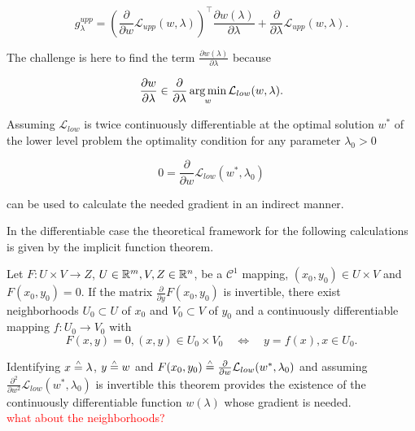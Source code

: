 \begin{equation*}
	g^{upp}_{\lambda} = \left(\frac{\partial}{\partial w}\mathcal{L}_{upp}(w,\lambda) \right)^{\top}\frac{\partial w(\lambda)}{\partial\lambda}+\frac{\partial}{\partial \lambda}\mathcal{L}_{upp}(w,\lambda).
\end{equation*}

The challenge is here to find the term \(\frac{\partial w(\lambda)}{\partial\lambda}\) because 

\[ \frac{\partial w}{\partial \lambda} \in \frac{\partial }{\partial \lambda} \operatorname*{arg\,min}_{w} \mathcal{L}_{low}(w,\lambda). \]

Assuming \(\mathcal{L}_{low}\) is twice continuously differentiable at the  optimal solution \(w^*\) of the lower level problem the optimality condition for any parameter \(\lambda_0 > 0\)

\begin{equation}
	0 = \frac{\partial}{\partial w}\mathcal{L}_{low}(w^*,\lambda_0)
\label{opt_con}
\end{equation}


can be used to calculate the needed gradient in an indirect manner.

In the differentiable case the theoretical framework for the following calculations is given by the implicit function theorem.

\begin{theorem}
	Let \(F: U \times V \to Z \), \(U\in\mathbb{R}^m, V,Z\in \mathbb{R}^n \), be a \(\mathcal{C}^1\) mapping, \((x_0,y_0) \in U\times V\)  and \(F(x_0,y_0) = 0\). If the matrix \(\frac{\partial}{\partial y}F(x_0,y_0)\) is invertible, there exist neighborhoods \(U_0\subset U\) of \(x_0\) and \(V_0\subset V\) of \(y_0\) and a continuously differentiable mapping \(f:U_0 \to V_0\) with 
	\begin{equation*}
	F(x,y) = 0, (x,y)\in U_0\times V_0  \quad \Leftrightarrow \quad y = f(x), x\in U_0.
	\end{equation*}
\end{theorem}

Identifying \(x \overset{\scriptscriptstyle\wedge}{=} \lambda\), \(y \overset{\scriptscriptstyle\wedge}{=} w\) and  \(F(x_0,y_0) \overset{\scriptscriptstyle\wedge}{=} \frac{\partial}{\partial w} \mathcal{L}_{low}(w^*,\lambda_0)\) and assuming \(\frac{\partial^2 }{\partial  w^2}\mathcal{L}_{low}(w^*,\lambda_0)\) is invertible this theorem provides the existence of the continuously differentiable function \(w(\lambda)\) whose gradient is needed. \\
\textcolor{red}{what about the neighborhoods?}

